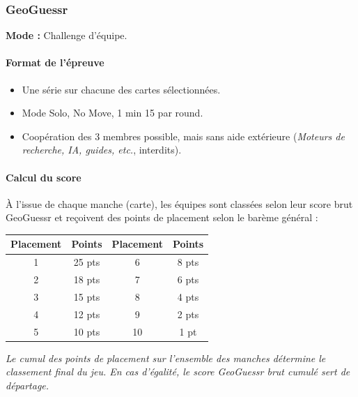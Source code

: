 \documentclass[11pt,a4paper]{article}
\begin{document}
    \subsubsection{GeoGuessr}
    \textbf{Mode :} Challenge d'équipe.

    \paragraph{Format de l'épreuve}
    \begin{itemize}
        \item Une série sur chacune des cartes sélectionnées.
        \item Mode Solo, No Move, 1 min 15 par round.
        \item Coopération des 3 membres possible, mais sans aide extérieure (\textit{Moteurs de recherche, IA, guides, etc.}, interdits).
    \end{itemize}

    \paragraph{Calcul du score}
    À l'issue de chaque manche (carte), les équipes sont classées selon leur score brut GeoGuessr et reçoivent des points de placement selon le barème général :

    \begin{center}
        \begin{tabular}{|c|c||c|c|}
            \hline
            \textbf{Placement} & \textbf{Points} & \textbf{Placement} & \textbf{Points} \\
            \hline
            1\ier{}  & 25 pts & 6\ieme{}  & 8 pts \\
            2\ieme{} & 18 pts & 7\ieme{}  & 6 pts \\
            3\ieme{} & 15 pts & 8\ieme{}  & 4 pts \\
            4\ieme{} & 12 pts & 9\ieme{}  & 2 pts \\
            5\ieme{} & 10 pts & 10\ieme{} & 1 pt  \\
            \hline
        \end{tabular}
    \end{center}

    \textit{Le cumul des points de placement sur l'ensemble des manches détermine le classement final du jeu. En cas d'égalité, le score GeoGuessr brut cumulé sert de départage.}
\end{document}
